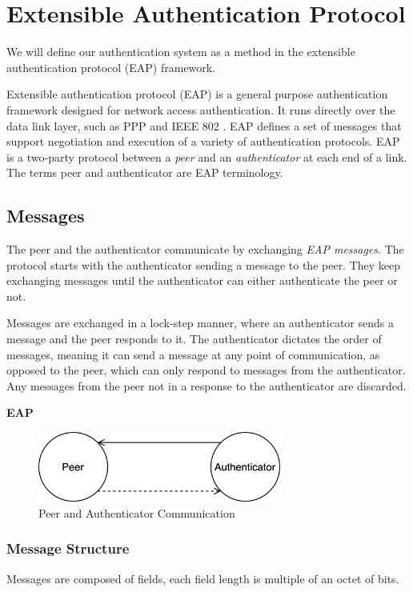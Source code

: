 \section{Extensible Authentication Protocol}
\label{section:eap}
We will define our authentication system as a method in the extensible authentication protocol (EAP) framework.

Extensible authentication protocol \cite{aboba2004extensible} (EAP) is a general purpose authentication framework designed for network access authentication. 
It runs directly over the data link layer, such as PPP \cite{simpson1994rfc1661} and IEEE 802 \cite{10.5555/18422.18423}.
EAP defines a set of messages that support negotiation and execution of a variety of authentication protocols.
EAP is a two-party protocol between a \textit{peer} and an \textit{authenticator} at each end of a link. The terms peer and authenticator are EAP terminology.


\subsection{Messages}
The peer and the authenticator communicate by exchanging \textit{EAP messages}.
The protocol starts with the authenticator sending a message to the peer. They keep exchanging messages until the authenticator can either authenticate the peer or not.

Messages are exchanged in a lock-step manner, where an authenticator sends a message and the peer responds to it. 
The authenticator dictates the order of messages, meaning it can send a message at any point of communication, as opposed to the peer, which can only respond to messages from the authenticator.
Any messages from the peer not in a response to the authenticator are discarded.
\bigskip
\begin{center}
	\textbf{EAP}
\end{center}
\begin{figure}[h]
	\centering
	\includegraphics[width=8cm]{images/eap-messages}
	\caption{Peer and Authenticator Communication}
	\label{fig:eap-messages}
\end{figure}

\subsubsection{Message Structure}
Messages are composed of fields, each field length is multiple of an octet of bits.

